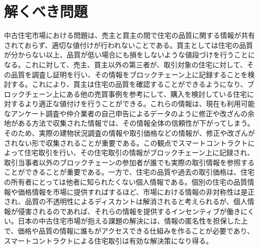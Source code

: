 \documentclass[a4paper,fontsize=11pt,report,notitlepage,line_length=38zw,number_of_lines=40,dvipdfmx]{jlreq}
\begin{document}
\section{解くべき問題}
中古住宅市場における問題は、売主と買主の間で住宅の品質に関する情報が共有されておらず、適切な値付けが行われないことである。買主としては住宅の品質が分からない以上、品質が低い場合にも損をしないような値段づけを行うことになる。これに対して、売主、買主以外の第三者が、取引対象の住宅に対して、その品質を調査し証明を行い、その情報をブロックチェーン上に記録することを検討する。これにより、買主は住宅の品質を確認することができるようになり、ブロックチェーン上にある他の売買事例を参考にして、購入を検討している住宅に対するより適正な値付けを行うことができる。これらの情報は、現在も利用可能なアンケート調査や仲介業者の自己申告によるデータのように修正や改ざんの余地がある方法で収集された情報では、その情報全体の信頼性が下がってしまう。そのため、実際の建物状況調査の情報や取引価格などの情報が、修正や改ざんがされない形で収集されることが重要である。この観点でスマートコントラクトによって住宅取引を行い、その住宅取引の情報がブロックチェーン上に記録され、取引当事者以外のブロックチェーンの参加者が誰でも実際の取引情報を参照することができることが重要である。一方で、住宅の品質や過去の取引価格は、住宅の所有者にとっては他者に知られたくない個人情報である。個別の住宅の品質情報や価格情報を市場に提供すればするほど、市場における情報の非対称性は是正され、品質の不透明性によるディスカントは解消されると考えられるが、個人情報が侵害されるのであれば、それらの情報を提供するインセンティブが働きにくい。日本の中古住宅市場が抱える課題の解決には、情報の匿名性を担保した上で、価格や品質の情報に誰もがアクセスできる仕組みを作ることが必要であり、スマートコントラクトによる住宅取引は有効な解決策になり得る。
\end{document}
